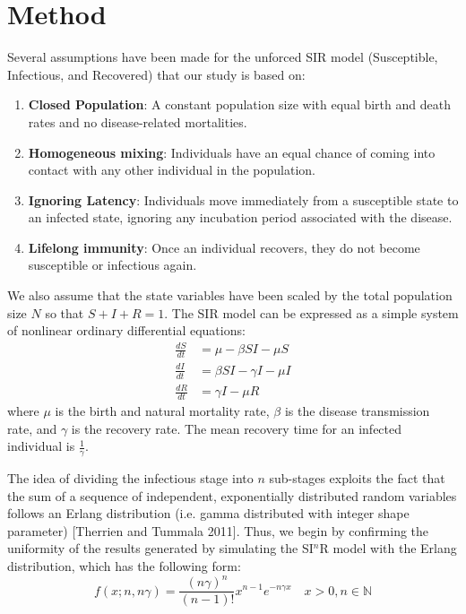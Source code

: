 \documentclass[12pt]{article}
\begin{document}
\section{Method}
Several assumptions have been made for the unforced SIR model (Susceptible, Infectious, and Recovered) that our study is based on: 
\begin{enumerate}
    \item \textbf{Closed Population}: A constant population size with equal birth and death rates and no disease-related mortalities.
    \item \textbf{Homogeneous mixing}: Individuals have an equal chance of coming into contact with any other individual in the population. 
    \item \textbf{Ignoring Latency}: Individuals move immediately from a susceptible state to an infected state, ignoring any incubation period associated with the disease.
    \item \textbf{Lifelong immunity}: Once an individual recovers, they do not become susceptible or infectious again.
\end{enumerate}
We also assume that the state variables have been scaled by the total population size $N$ so that $S + I + R = 1$. The SIR model can be expressed as a simple system of nonlinear ordinary differential equations:
\begin{align}
    \frac{dS}{dt} &= \mu - \beta SI - \mu S \\
    \frac{dI}{dt} &= \beta SI - \gamma I - \mu I \\
    \frac{dR}{dt} &= \gamma I - \mu R
\end{align}
where $\mu$ is the birth and natural mortality rate, $\beta$ is the disease transmission rate, and $\gamma$ is the recovery rate. The mean recovery time for an infected individual is $\frac{1}{\gamma}$. 

The idea of dividing the infectious stage into $n$ sub-stages exploits the fact that the sum of a sequence of independent, exponentially distributed random variables follows an Erlang distribution (i.e. gamma distributed with integer shape parameter) [Therrien and Tummala 2011]. Thus, we begin by confirming the uniformity of the results generated by simulating the SI$^n$R model with the Erlang distribution, which has the following form:
\begin{equation*}
    f(x; n,n\gamma) = \frac{(n\gamma)^n}{(n-1)!} x^{n-1} e^{-n\gamma x} \quad x>0, n \in \mathbb{N}
\end{equation*}
\end{document}
